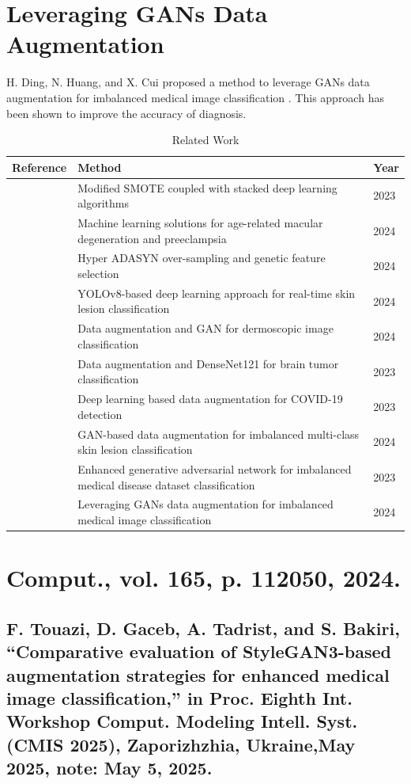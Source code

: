 \documentclass[final,5p,times,twocolumn,authoryear]{elsarticle}
\begin{document}
\section{Leveraging GANs Data Augmentation}
H. Ding, N. Huang, and X. Cui proposed a method to leverage GANs data augmentation for imbalanced medical image classification \cite{ref10}. This approach has been shown to improve the accuracy of diagnosis.
\begin{table}[htbp]
\centering
\caption{Related Work}
\begin{tabular}{lll}
\hline
Reference & Method & Year \\
\hline
\cite{ref1} & Modified SMOTE coupled with stacked deep learning algorithms & 2023 \\
\cite{ref2} & Machine learning solutions for age-related macular degeneration and preeclampsia & 2024 \\
\cite{ref3} & Hyper ADASYN over-sampling and genetic feature selection & 2024 \\
\cite{ref4} & YOLOv8-based deep learning approach for real-time skin lesion classification & 2024 \\
\cite{ref5} & Data augmentation and GAN for dermoscopic image classification & 2024 \\
\cite{ref6} & Data augmentation and DenseNet121 for brain tumor classification & 2023 \\
\cite{ref7} & Deep learning based data augmentation for COVID-19 detection & 2023 \\
\cite{ref8} & GAN-based data augmentation for imbalanced multi-class skin lesion classification & 2024 \\
\cite{ref9} & Enhanced generative adversarial network for imbalanced medical disease dataset classification & 2023 \\
\cite{ref10} & Leveraging GANs data augmentation for imbalanced medical image classification & 2024 \\
\hline
\end{tabular}
\end{table}

\section{Comput., vol. 165, p. 112050, 2024.}
\subsection{F. Touazi, D. Gaceb, A. Tadrist, and S. Bakiri, “Comparative evaluation of StyleGAN3-based augmentation strategies for enhanced medical image classification,” in Proc. Eighth Int. Workshop Comput. Modeling Intell. Syst. (CMIS 2025), Zaporizhzhia, Ukraine,May 2025, note: May 5, 2025.}
\end{document}
